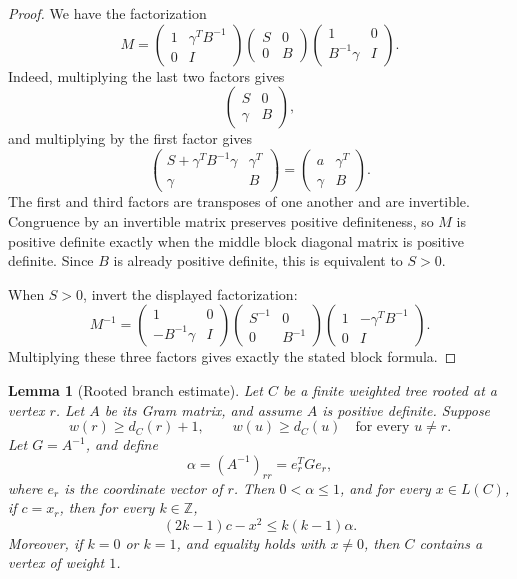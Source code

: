 \documentclass[12pt]{article}
\newcommand{\Z}{\mathbb{Z}}
\newtheorem{lemma}[theorem]{Lemma}
\begin{document}
\begin{proof}
We have the factorization
\[
M=
\begin{pmatrix}
1 & \gamma^T B^{-1}\\
0 & I
\end{pmatrix}
\begin{pmatrix}
S & 0\\
0 & B
\end{pmatrix}
\begin{pmatrix}
1 & 0\\
B^{-1}\gamma & I
\end{pmatrix}.
\]
Indeed, multiplying the last two factors gives
\[
\begin{pmatrix}
S & 0\\
\gamma & B
\end{pmatrix},
\]
and multiplying by the first factor gives
\[
\begin{pmatrix}
S+\gamma^T B^{-1}\gamma & \gamma^T\\
\gamma & B
\end{pmatrix}
=
\begin{pmatrix}
a & \gamma^T\\
\gamma & B
\end{pmatrix}.
\]
The first and third factors are transposes of one another and are invertible. Congruence by an invertible matrix preserves positive definiteness, so \(M\) is positive definite exactly when the middle block diagonal matrix is positive definite. Since \(B\) is already positive definite, this is equivalent to \(S>0\).

When \(S>0\), invert the displayed factorization:
\[
M^{-1}=
\begin{pmatrix}
1 & 0\\
-B^{-1}\gamma & I
\end{pmatrix}
\begin{pmatrix}
S^{-1} & 0\\
0 & B^{-1}
\end{pmatrix}
\begin{pmatrix}
1 & -\gamma^T B^{-1}\\
0 & I
\end{pmatrix}.
\]
Multiplying these three factors gives exactly the stated block formula.
\end{proof}

\begin{lemma}[Rooted branch estimate]\label{lem:branch}
Let \(C\) be a finite weighted tree rooted at a vertex \(r\). Let \(A\) be its Gram matrix, and assume \(A\) is positive definite. Suppose
\[
w(r)\ge d_C(r)+1,
\qquad
w(u)\ge d_C(u)\quad\text{for every }u\ne r.
\]
Let \(G=A^{-1}\), and define
\[
\alpha=(A^{-1})_{rr}=e_r^TGe_r,
\]
where \(e_r\) is the coordinate vector of \(r\). Then \(0<\alpha\le 1\), and for every \(x\in L(C)\), if \(c=x_r\), then for every \(k\in\Z\),
\[
(2k-1)c-x^2\le k(k-1)\alpha.
\]
Moreover, if \(k=0\) or \(k=1\), and equality holds with \(x\ne 0\), then \(C\) contains a vertex of weight \(1\).
\end{lemma}
\end{document}
